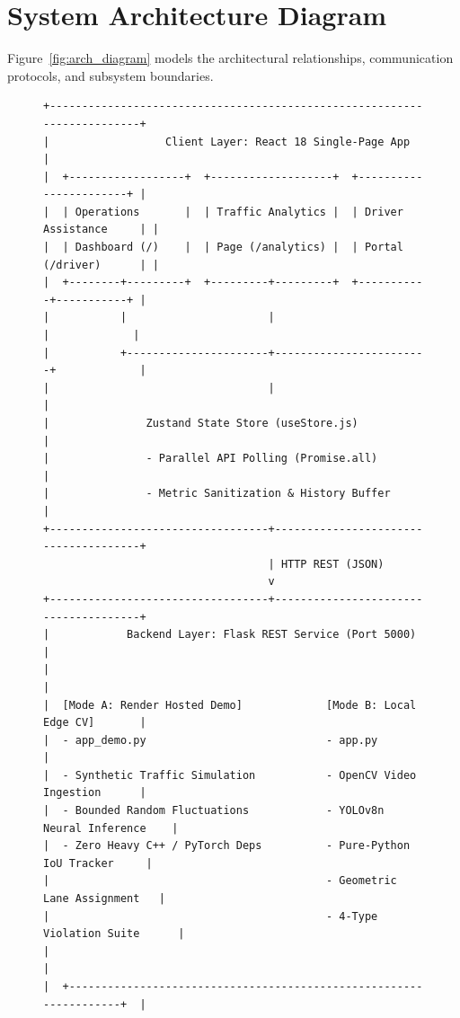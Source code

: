 \documentclass[11pt,a4paper,oneside]{report}
\begin{document}
\section{System Architecture Diagram}
Figure~\ref{fig:arch_diagram} models the architectural relationships, communication protocols, and subsystem boundaries.

\begin{figure}[h!]
\centering
\small
\begin{tcolorbox}[colback=white,colframe=branddark,arc=2mm,title=\textbf{High-Level Architecture Schematic}]
\begin{verbatim}
+-------------------------------------------------------------------------+
|                  Client Layer: React 18 Single-Page App                 |
|  +------------------+  +-------------------+  +-----------------------+ |
|  | Operations       |  | Traffic Analytics |  | Driver Assistance     | |
|  | Dashboard (/)    |  | Page (/analytics) |  | Portal (/driver)      | |
|  +--------+---------+  +---------+---------+  +-----------+-----------+ |
|           |                      |                        |             |
|           +----------------------+------------------------+             |
|                                  |                                      |
|               Zustand State Store (useStore.js)                         |
|               - Parallel API Polling (Promise.all)                      |
|               - Metric Sanitization & History Buffer                    |
+----------------------------------+--------------------------------------+
                                   | HTTP REST (JSON)
                                   v
+----------------------------------+--------------------------------------+
|            Backend Layer: Flask REST Service (Port 5000)                |
|                                                                         |
|  [Mode A: Render Hosted Demo]             [Mode B: Local Edge CV]       |
|  - app_demo.py                            - app.py                      |
|  - Synthetic Traffic Simulation           - OpenCV Video Ingestion      |
|  - Bounded Random Fluctuations            - YOLOv8n Neural Inference    |
|  - Zero Heavy C++ / PyTorch Deps          - Pure-Python IoU Tracker     |
|                                           - Geometric Lane Assignment   |
|                                           - 4-Type Violation Suite      |
|                                                                         |
|  +-------------------------------------------------------------------+  |

\end{verbatim}
\end{tcolorbox}
\end{figure}
\end{document}

